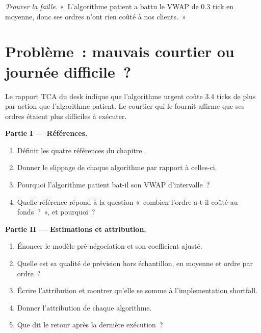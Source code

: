 \begin{exercise}[$\star\star\star$]\label{exo:mx:transaction-cost-analysis:8}
\emph{Trouver la faille.} «~L'algorithme patient a battu le VWAP de 0.3 tick en moyenne, donc ses ordres n'ont rien coûté à nos clients.~»
\end{exercise}

\section{Problème~: mauvais courtier ou journée difficile~?}

\begin{problem}\label{pb:mx:transaction-cost-analysis:1}
Le rapport TCA du desk indique que l'algorithme urgent coûte 3.4 ticks de plus par action que l'algorithme patient. Le courtier qui le fournit affirme que ses ordres étaient plus difficiles à exécuter.

\medskip\noindent\textbf{Partie I --- Références.}
\begin{enumerate}
\item Définir les quatre références du chapitre.
\item Donner le slippage de chaque algorithme par rapport à celles-ci.
\item Pourquoi l'algorithme patient bat-il son VWAP d'intervalle~?
\item Quelle référence répond à la question «~combien l'ordre a-t-il coûté au fonds~?~», et pourquoi~?
\end{enumerate}

\medskip\noindent\textbf{Partie II --- Estimations et attribution.}
\begin{enumerate}[resume]
\item Énoncer le modèle pré-négociation et son coefficient ajusté.
\item Quelle est sa qualité de prévision hors échantillon, en moyenne et ordre par ordre~?
\item Écrire l'attribution et montrer qu'elle se somme à l'implementation shortfall.
\item Donner l'attribution de chaque algorithme.
\item Que dit le retour après la dernière exécution~?
\end{enumerate}


\end{problem}
